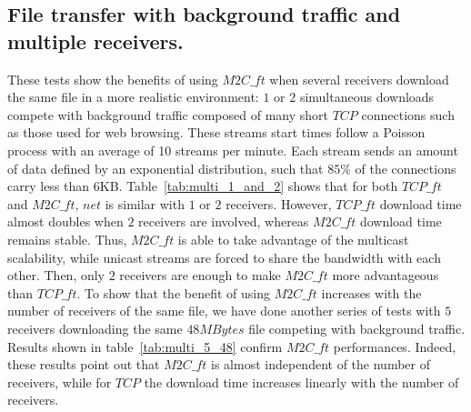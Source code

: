 \documentclass[a4paper]{article}
\begin{document}
    \subsection{File transfer with background traffic and multiple receivers.}
        These tests show the benefits of using $M2C\_ft$ when several receivers
        download the same file in a more realistic environment: $1$ or $2$
        simultaneous downloads compete with background traffic composed of many
        short $TCP$ connections such as those used for web browsing. These
        streams start times follow a Poisson process with an average of 10
        streams per minute. Each stream sends an amount of data defined by
        an exponential distribution, such that $85\%$ of the connections carry
        less than $6$KB.
Table~\ref{tab:multi_1_and_2} shows that for both $TCP\_ft$ and
        $M2C\_ft$, $net$ is similar with $1$ or $2$ receivers.  However,
        $TCP\_ft$ download time almost doubles when $2$ receivers are involved,
        whereas $M2C\_ft$ download time remains stable. Thus, $M2C\_ft$ is able
        to take advantage of the multicast scalability, while unicast streams
        are forced to share the bandwidth with each other. Then, only $2$
        receivers are enough to make $M2C\_ft$ more advantageous than $TCP\_ft$.
To show that the benefit of using $M2C\_ft$ increases with the
        number of receivers of the same file, we have done another series of
        tests with $5$ receivers downloading the same $48MBytes$ file competing
        with background traffic. Results shown in table~\ref{tab:multi_5_48}
        confirm $M2C\_ft$ performances. Indeed, these results point out that
        $M2C\_ft$ is almost independent of the number of receivers, while for
        $TCP$ the download time increases linearly with the number of receivers.
\end{document}
